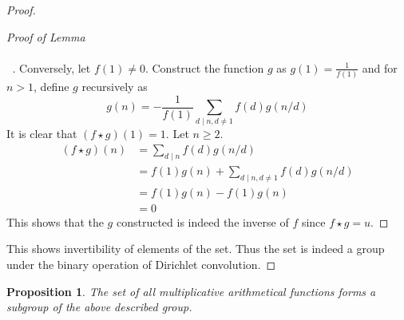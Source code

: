 \documentclass[10pt,openany]{book}
\newtheorem{proposition}[theorem]{Proposition}
\theoremstyle{italicnonumber}
\newenvironment{prooflem}[1][]{
  \renewcommand{\qedsymbol}{\ensuremath{\backslash\backslash\backslash}}
  \begin{proof}[Proof of Lemma\ifx\\#1\\\else~#1\fi]
}{
  \end{proof}
  \renewcommand{\qedsymbol}{\oldqedsymbol}%
}
\theoremstyle{definition}
\renewcommand\qedsymbol{$\blacksquare$}
\begin{document}
\begin{proof}
\begin{prooflem}
  Conversely, let $f(1)\neq 0$. Construct the function $g$ as $g(1) = \frac{1}{f(1)}$ and for $n > 1$, define $g$ recursively as
  \[
  g(n) = -\frac{1}{f(1)} \sum_{d \mid n, d \neq 1} f(d) g(n/d)
  \]
  It is clear that $(f\star g)(1)=1$. Let $n \geq 2$.
  \[
  \begin{aligned}
    (f \star g)(n) & = \sum_{d \mid n}f(d)g(n/d) \\
    & = f(1)g(n) + \sum_{d \mid n, d \neq 1} f(d)g(n/d) \\
    & = f(1)g(n) - f(1)g(n) \\
    & = 0
  \end{aligned}
  \]
  This shows that the $g$ constructed is indeed the inverse of $f$ since $f \star g = u$.
  \end{prooflem}
  This shows invertibility of elements of the set. Thus the set is indeed a group under the binary operation of Dirichlet convolution.
\end{proof}

\begin{proposition}
  The set of all multiplicative arithmetical functions forms a subgroup of the above described group.
\end{proposition}
\end{document}
